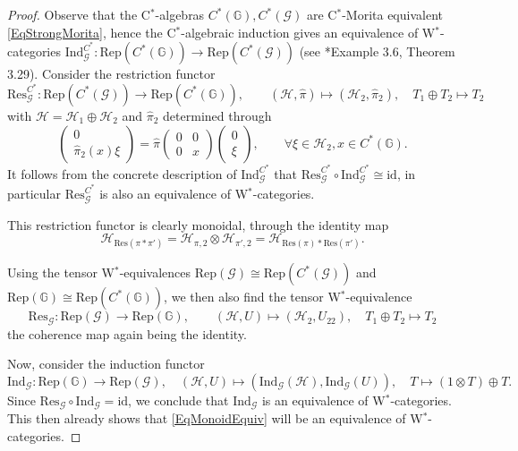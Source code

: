\documentclass[reqno]{amsart}
\numberwithin{equation}{section}
\newcommand{\id}{\mathrm{id}}
\newcommand{\Hsp}{\mathcal{H}}
\newcommand{\G}{\mathbb{G}}
\newcommand{\msG}{\mathscr{G}}
\newcommand{\Rep}{\mathrm{Rep}}
\newcommand{\Ind}{\mathrm{Ind}}
\newcommand{\Res}{\mathrm{Res}}
\begin{document}
\begin{proof}
Observe that the C$^*$-algebras $C^*(\G),C^*(\msG)$ are  C$^*$-Morita equivalent \eqref{EqStrongMorita}, hence the C$^*$-algebraic induction gives an equivalence of W$^*$-categories $\Ind^{C^*}_{\msG}\colon \Rep(C^*(\G))\rightarrow \Rep(C^*(\msG))$ (see \cite{RW98}*{Example 3.6, Theorem 3.29}). Consider the restriction functor
\[
\Res^{C^*}_{\msG}\colon \Rep(C^*(\msG)) \rightarrow \Rep(C^*(\G)),\qquad (\Hsp,\hat{\pi}) \mapsto (\Hsp_2,\hat{\pi}_2),\quad T_1\oplus T_2\mapsto T_2
\]
with $\Hsp=\Hsp_1\oplus\Hsp_2$ and $\hat{\pi}_2$ determined through 
\[
\begin{pmatrix} 0 \\ \hat{\pi}_2(x)\xi\end{pmatrix}  = \hat{\pi}\begin{pmatrix} 0 & 0 \\ 0 & x\end{pmatrix}\begin{pmatrix}0 \\ \xi\end{pmatrix},\qquad \forall \xi\in\Hsp_2,x\in C^*(\G).
\] 
 It follows from the concrete description of $\Ind^{C^*}_{\msG}$ that $\Res^{C^*}_{\msG}\circ \Ind^{C^*}_{\msG}\cong\id$, in particular $\Res^{C^*}_{\msG}$ is also an equivalence of W$^*$-categories. 
 
This restriction functor is clearly monoidal, through the identity map
\[
\Hsp_{\Res(\pi \ast\pi')} = \Hsp_{\pi,2}\otimes \Hsp_{\pi',2} = \Hsp_{\Res(\pi)*\Res(\pi')}.
\]

Using the tensor W$^*$-equivalences $\Rep(\msG) \cong \Rep(C^*(\msG))$ and $\Rep(\G)\cong \Rep(C^*(\G))$, we then also find the tensor W$^*$-equivalence 
\[
\Res_{\msG}\colon \Rep(\msG) \rightarrow \Rep(\G),\qquad (\Hsp,U) \mapsto (\Hsp_2,U_{22}),\quad 
T_1\oplus T_2\mapsto T_2
\]
the coherence map again being the identity. 

Now, consider the induction functor
\[
\Ind_{\msG}\colon \Rep(\G)\rightarrow \Rep(\msG),\quad (\Hsp,U)\mapsto (\Ind_{\msG}(\Hsp),\Ind_{\msG}(U)),\quad
T\mapsto (1\otimes T)\oplus T.
\]
Since $\Res_{\msG}\circ \Ind_{\msG}=\id $, we conclude that $\Ind_{\msG}$ is an equivalence of W$^*$-categories. This then already shows that \eqref{EqMonoidEquiv} will be an equivalence of W$^*$-categories. 


\end{proof}
\end{document}
